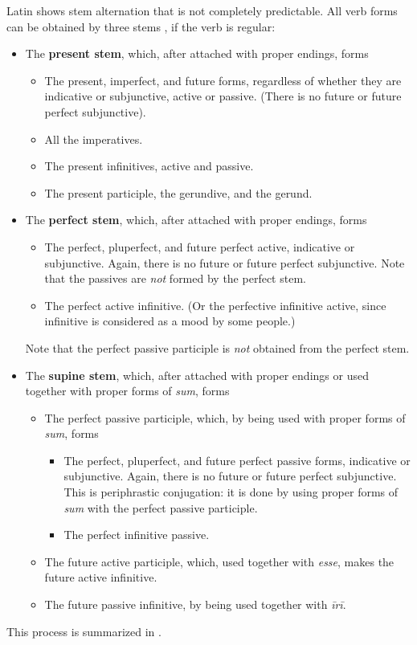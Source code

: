\documentclass[a4paper, oneside]{report}
\newcommand*{\citesec}[1]{\S~{#1}}
\newcommand*{\concept}[1]{\textbf{#1}}
\newcommand{\form}[1]{\emph{#1}}
\begin{document}
Latin shows stem alternation that is not completely predictable.
All verb forms can be obtained by three stems \citep[\citesec{164}]{allen1903allen},
if the verb is regular:
\begin{itemize}
    \item The \concept{present stem}, which, after attached with proper endings, forms
    \begin{itemize}
        \item The \acl{present}, \acl{imperfect}, and future forms, 
        regardless of whether they are indicative or subjunctive,
        active or passive. (There is no future or future perfect subjunctive).
        \item All the imperatives.
        \item The present infinitives, active and passive.
        \item The present participle, the gerundive, and the gerund.
    \end{itemize}
    \item The \concept{perfect stem}, which, after attached with proper endings, forms 
    \begin{itemize}
        \item The perfect, pluperfect, and future perfect active, indicative or subjunctive.
        Again, there is no future or future perfect subjunctive.
        Note that the passives are \emph{not} formed by the perfect stem.
        \item The perfect active infinitive. 
        (Or the perfective infinitive active, since infinitive is considered as a mood by some people.)
    \end{itemize}
    Note that the perfect passive participle is \emph{not} obtained from the perfect stem.
    \item The \concept{supine stem}, 
    which, after attached with proper endings or used together with proper forms of \form{sum},
    forms 
    \begin{itemize}
        \item The perfect passive participle, which, by being used with proper forms of \form{sum}, forms
        \begin{itemize}
            \item The perfect, pluperfect, and future perfect passive forms, indicative or subjunctive.
            Again, there is no future or future perfect subjunctive.
            This is periphrastic conjugation: it is done by using proper forms of \form{sum}
            with the perfect passive participle.
            \item The perfect infinitive passive.
        \end{itemize}
        \item The future active participle, which, used together with \form{esse},
        makes the future active infinitive.
        \item The future passive infinitive, by being used together with \form{īrī}.
    \end{itemize}
\end{itemize}
This process is summarized in .
\end{document}
